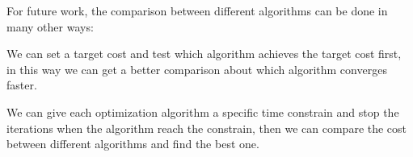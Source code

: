 \documentclass[12pt]{article}
\begin{document}
For future work, the comparison between different algorithms can be done in many other ways: 

We can set a target cost and test which algorithm achieves the target cost first, in this way we can get a better comparison about which algorithm converges faster.
  
We can give each optimization algorithm a specific time constrain and stop the iterations when the algorithm reach the constrain, then we can compare the cost between different algorithms and find the best one.

    
    
\end{document}
